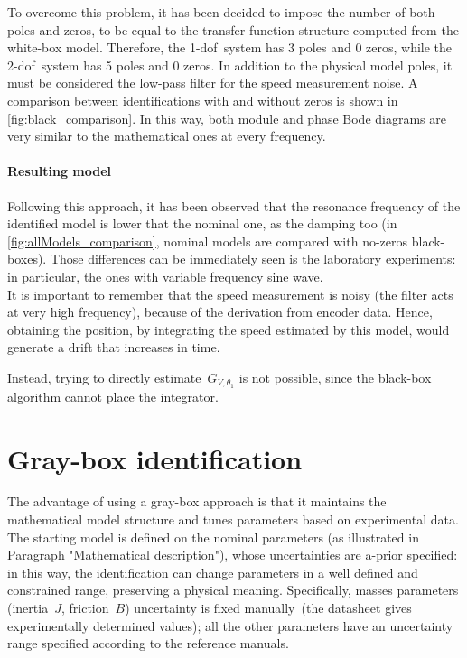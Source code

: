 To overcome this problem, it has been decided to impose the number of both poles and zeros, to be equal to the transfer function structure computed from the white-box model. Therefore, the \acrshort{1-dof}\ system has 3 poles and 0 zeros, while the \acrshort{2-dof}\ system has 5 poles and 0 zeros.
In addition to the physical model poles, it must be considered the low-pass filter for the speed measurement noise.  A comparison between identifications with and without zeros is shown in \cref{fig:black_comparison}.
In this way, both module and phase Bode diagrams are very similar to the mathematical ones at every frequency.

\paragraph{Resulting model}

Following this approach, it has been observed that the resonance frequency of the identified model is lower that the nominal one, as the damping too (in \cref{fig:allModels_comparison}, nominal models are compared with no-zeros black-boxes).
Those differences can be immediately seen is the laboratory experiments: in particular, the ones with variable frequency sine wave. \\
It is important to remember that the speed measurement is noisy (the filter acts at very high frequency), because of the derivation from encoder data. Hence, obtaining the position, by integrating the speed estimated by this model, would generate a drift that increases in time.

Instead, trying to directly estimate~$G_{V,\theta_1}$ is not possible, since the black-box algorithm cannot place the integrator.

\section{Gray-box identification} \label{sec:gray_b_id}

\par The advantage of using a gray-box approach is that it maintains the mathematical model structure and tunes parameters based on experimental data. The starting model is defined on the nominal parameters (as illustrated in Paragraph "Mathematical description"), whose uncertainties are a-prior specified: in this way, the identification can change parameters in a well defined and constrained range, preserving a physical meaning. Specifically, masses parameters (inertia~$J$, friction~$B$) uncertainty is fixed manually~(the datasheet gives experimentally determined values); all the other parameters have an uncertainty range specified according to the reference manuals.

